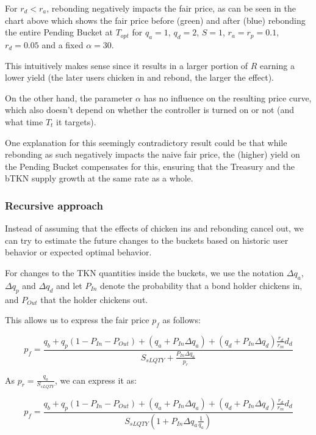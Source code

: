 \documentclass{article}
\begin{document}
For $r_d < r_a$, rebonding negatively impacts the fair price, as can be seen in the chart above which shows the fair price before (green) and after (blue) rebonding the entire Pending Bucket at $T_{opt}$ for $q_a=1$, $q_d=2$, $S=1$, $r_a=r_p=0.1$, $r_d=0.05$ and a fixed $\alpha=30$. 

This intuitively makes sense since it results in a larger portion of $R$ earning a lower yield (the later users chicken in and rebond, the larger the effect). 

On the other hand, the parameter $\alpha$ has no influence on the resulting price curve, which also doesn't depend on whether the controller is turned on or not (and what time $T_t$ it targets).

One explanation for this seemingly contradictory result could be that while rebonding as such negatively impacts the naive fair price, the (higher) yield on the Pending Bucket compensates for this, ensuring that the Treasury and the bTKN supply growth at the same rate as a whole.

\subsubsection{Recursive approach}
Instead of assuming that the effects of chicken ins and rebonding cancel out, we can try to estimate the future changes to the buckets based on historic user behavior or expected optimal behavior.

For changes to the TKN quantities inside the buckets, we use the notation $\Delta q_{a}$, $\Delta q_{p}$ and $\Delta q_{d}$ and let $P_{In}$ denote the probability that a bond holder chickens in, and $P_{Out}$ that the holder chickens out.

This allows us to express the fair price $p_f$ as follows:

\begin{equation}
  \label{}
    p_{f} = \frac{q_{b}+q_{p}(1-P_{In}-P_{Out})+(q_{a}+ P_{In}\Delta q_{a})+(q_{d} + P_{In}\Delta q_{d})\frac{r_{d}}{r_{m}}d_{d}}{S_{sLQTY} + \frac{P_{In}\Delta q_a}{p_r}}
\end{equation}

As $p_r = \frac{q_a}{S_{sLQTY}}$, we can express it as:

\begin{equation}
  \label{eq:recursive_hist}
    p_{f} = \frac{q_{b}+q_{p}(1-P_{In}-P_{Out})+(q_{a}+ P_{In}\Delta q_{a})+(q_{d} + P_{In}\Delta q_{d})\frac{r_{d}}{r_{m}}d_{d}}{S_{sLQTY} \left( 1+P_{In} \Delta q_{a} \frac{1}{q_{a}} \right)}
\end{equation}
\end{document}
